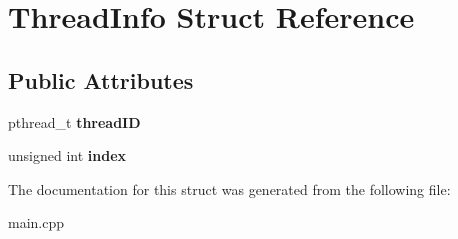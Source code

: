 \hypertarget{structThreadInfo}{}\section{Thread\+Info Struct Reference}
\label{structThreadInfo}
\subsection*{Public Attributes}
\begin{DoxyCompactItemize}
\item 
\mbox{\label{structThreadInfo_ae62b6c2af221a6e0bf5d18e7f08a9743}} 
pthread\+\_\+t {\bfseries thread\+ID}
\item 
\mbox{\label{structThreadInfo_a787952d0588cfcdd64fdf79bdbf115f7}} 
unsigned int {\bfseries index}
\end{DoxyCompactItemize}


The documentation for this struct was generated from the following file\+:\begin{DoxyCompactItemize}
\item 
main.\+cpp\end{DoxyCompactItemize}
